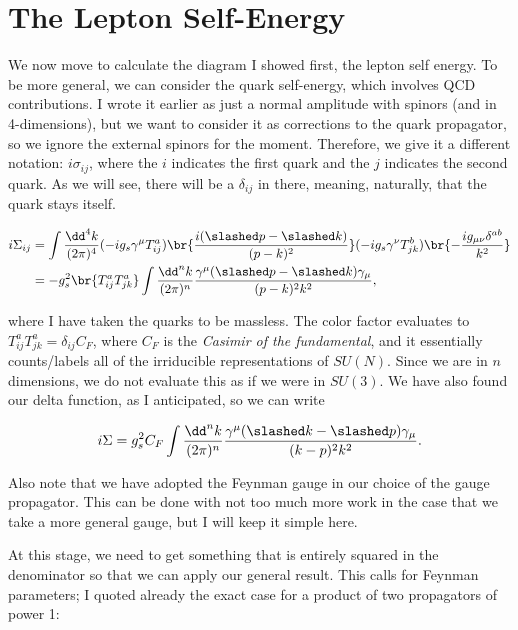 \documentclass[titlepage]{article}
\begin{document}
\section{The Lepton Self-Energy}

We now move to calculate the diagram I showed first, the lepton self energy. To be more general, we can consider the quark self-energy, which involves QCD contributions. I wrote it earlier as just a normal amplitude with spinors (and in 4-dimensions), but we want to consider it as corrections to the quark propagator, so we ignore the external spinors for the moment. Therefore, we give it a different notation: $i\sigma_{ij}$, where the $i$ indicates the first quark and the $j$ indicates the second quark. As we will see, there will be a $\delta_{ij}$ in there, meaning, naturally, that the quark stays itself.

\begin{align}
  i\Sigma_{ij} &= \int \frac{\dd^4k}{(2\pi)^4} (-ig_s\gamma^\mu T_{ij}^a) \br{\frac{i(\psl - \ksl)}{(p-k)^2}} (-ig_s\gamma^\nu T_{jk}^b) \br{- \frac{ig_{\mu\nu}\delta^{ab}}{k^2}} \\
  &= -g_s^2 \br{T_{ij}^a T_{jk}^a} \int \frac{\dd^nk}{(2\pi)^n} \frac{\gamma^\mu (\psl - \ksl) \gamma_\mu}{(p-k)^2k^2},
\end{align}

where I have taken the quarks to be massless. The color factor evaluates to $T_{ij}^a T_{jk}^a = \delta_{ij}C_F$, where $C_F$ is the \textit{Casimir of the fundamental}, and it essentially counts/labels all of the irriducible representations of $SU(N)$. Since we are in $n$ dimensions, we do not evaluate this as if we were in $SU(3)$. We have also found our delta function, as I anticipated, so we can write

\begin{equation}
  i\Sigma = g_s^2 C_F \int \frac{\dd^nk}{(2\pi)^n} \frac{\gamma^\mu(\ksl - \psl)\gamma_\mu}{(k-p)^2k^2}.
\end{equation}

Also note that we have adopted the Feynman gauge in our choice of the gauge propagator. This can be done with not too much more work in the case that we take a more general gauge, but I will keep it simple here.

At this stage, we need to get something that is entirely squared in the denominator so that we can apply our general result. This calls for Feynman parameters; I quoted already the exact case for a product of two propagators of power 1:
\end{document}
